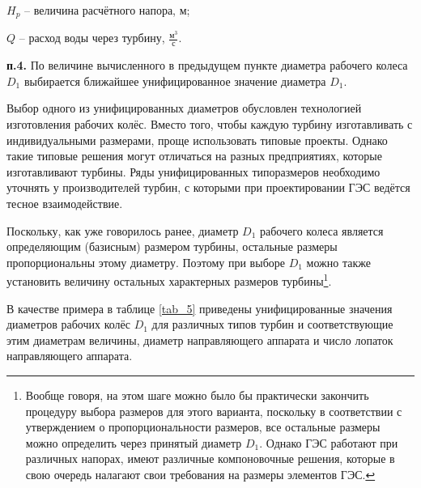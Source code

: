 $H_p$ -- величина расчётного напора, м;

$Q$ -- расход воды через турбину, $\frac{\text{м}^3}{\text{с}}$.

\vspace{1cm}

\textbf{п.4.} По величине вычисленного в предыдущем пункте диаметра рабочего колеса $D_1$  выбирается ближайшее унифицированное значение диаметра $D_1$.

Выбор одного из унифицированных диаметров обусловлен технологией изготовления рабочих колёс. Вместо того, чтобы каждую турбину изготавливать с индивидуальными размерами, проще использовать типовые проекты. Однако такие типовые решения могут отличаться на разных предприятиях, которые изготавливают турбины. Ряды унифицированных типоразмеров необходимо уточнять у производителей турбин, с которыми при проектировании ГЭС ведётся тесное взаимодействие. 

Поскольку, как уже говорилось ранее, диаметр $D_1$ рабочего колеса является определяющим (базисным) размером турбины, остальные размеры пропорциональны этому диаметру. Поэтому при выборе $D_1$ можно также установить величину остальных характерных размеров турбины\footnote{Вообще говоря, на этом шаге можно было бы практически закончить процедуру выбора размеров для этого варианта, поскольку в соответствии с утверждением о пропорциональности размеров, все остальные размеры можно определить через принятый диаметр $D_1$. Однако ГЭС работают при различных напорах, имеют различные компоновочные решения, которые в свою очередь налагают свои требования на размеры элементов ГЭС.}.

В качестве примера в таблице \ref{tab_5} приведены унифицированные значения диаметров рабочих колёс $D_1$ для различных типов турбин и соответствующие этим диаметрам величины, диаметр направляющего аппарата и число лопаток направляющего аппарата. 


